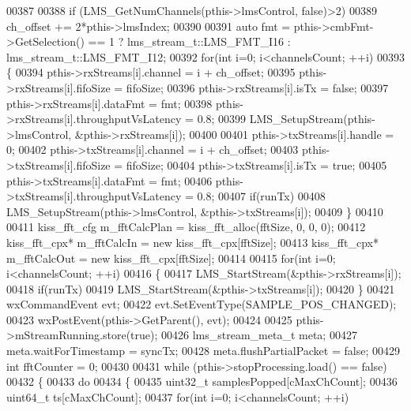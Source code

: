 \begin{DoxyCode}
{{{00387 
00388     \textcolor{keywordflow}{if} (LMS_GetNumChannels(pthis->lmsControl, \textcolor{keyword}{false})>2)
00389         ch\_offset += 2*pthis->lmsIndex;
00390 
00391     \textcolor{keyword}{auto} fmt = pthis->cmbFmt->GetSelection() == 1 ? lms_stream_t::LMS_FMT_I16 : 
      lms_stream_t::LMS_FMT_I12;
00392     \textcolor{keywordflow}{for}(\textcolor{keywordtype}{int} i=0; i<channelsCount; ++i)
00393     \{
00394         pthis->rxStreams[i].channel = i + ch\_offset;
00395         pthis->rxStreams[i].fifoSize = fifoSize;
00396         pthis->rxStreams[i].isTx = \textcolor{keyword}{false};
00397         pthis->rxStreams[i].dataFmt = fmt;
00398         pthis->rxStreams[i].throughputVsLatency = 0.8;
00399         LMS_SetupStream(pthis->lmsControl, &pthis->rxStreams[i]);
00400 
00401         pthis->txStreams[i].handle = 0;
00402         pthis->txStreams[i].channel = i + ch\_offset;
00403         pthis->txStreams[i].fifoSize = fifoSize;
00404         pthis->txStreams[i].isTx = \textcolor{keyword}{true};
00405         pthis->txStreams[i].dataFmt = fmt;
00406         pthis->txStreams[i].throughputVsLatency = 0.8;
00407         \textcolor{keywordflow}{if}(runTx)
00408             LMS_SetupStream(pthis->lmsControl, &pthis->txStreams[i]);
00409     \}
00410 
00411     kiss\_fft\_cfg m\_fftCalcPlan = kiss\_fft\_alloc(fftSize, 0, 0, 0);
00412     kiss\_fft\_cpx* m\_fftCalcIn = \textcolor{keyword}{new} kiss\_fft\_cpx[fftSize];
00413     kiss\_fft\_cpx* m\_fftCalcOut = \textcolor{keyword}{new} kiss\_fft\_cpx[fftSize];
00414 
00415     \textcolor{keywordflow}{for}(\textcolor{keywordtype}{int} i=0; i<channelsCount; ++i)
00416     \{
00417         LMS_StartStream(&pthis->rxStreams[i]);
00418         \textcolor{keywordflow}{if}(runTx)
00419             LMS_StartStream(&pthis->txStreams[i]);
00420     \}
00421     wxCommandEvent evt;
00422     evt.SetEventType(SAMPLE\_POS\_CHANGED);
00423     wxPostEvent(pthis->GetParent(), evt);
00424 
00425     pthis->mStreamRunning.store(\textcolor{keyword}{true});
00426     lms_stream_meta_t meta;
00427     meta.waitForTimestamp = syncTx;
00428     meta.flushPartialPacket = \textcolor{keyword}{false};
00429     \textcolor{keywordtype}{int} fftCounter = 0;
00430 
00431     \textcolor{keywordflow}{while} (pthis->stopProcessing.load() == \textcolor{keyword}{false})
00432     \{
00433         \textcolor{keywordflow}{do}
00434         \{
00435             uint32\_t samplesPopped[cMaxChCount];
00436             uint64\_t ts[cMaxChCount];
00437             \textcolor{keywordflow}{for}(\textcolor{keywordtype}{int} i=0; i<channelsCount; ++i)
}}}
\end{DoxyCode}
